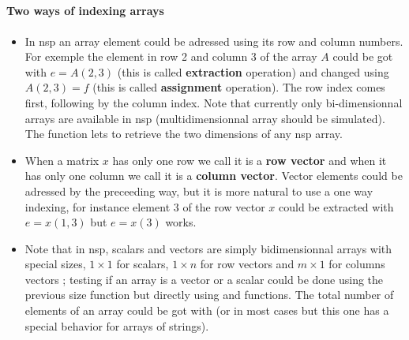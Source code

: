 
\begin{mandesc}
   \\
   \\
   \\
\end{mandesc}

\paragraph{Two ways of indexing arrays}
\begin{itemize}

\item  In nsp an array element could be adressed using its row 
 and column numbers. For exemple the element in row 2
 and column 3 of the array $A$ could be got with
 $e = A(2,3)$ (this is called {\bf extraction} operation) 
and changed using $A(2,3) = f$ (this is called {\bf assignment} operation). 
The row  index comes first, following by the column index. 
Note that currently only bi-dimensionnal arrays are available in nsp
(multidimensionnal array should be simulated).
The function  lets to retrieve the two dimensions
of any nsp array.

\item When a matrix $x$ has only one row we call it
 is a {\bf row vector} and when it has only one column we
 call it is a {\bf column vector}. Vector elements could be 
 adressed by the preceeding way, but it is more natural
 to use a one way indexing, for instance element 3 of the
 row vector $x$ could be extracted with $e = x(1,3)$ but 
 $e = x(3)$ works. 

\item Note that in nsp, scalars and vectors are simply bidimensionnal 
arrays with special sizes, $1 \times 1$ for scalars, $1 \times n$ for
row vectors and  $m \times 1$ for columns vectors ; testing if an array
is a vector or a scalar could be done using the previous size function
but directly using  and 
functions. The total number of elements of an array could be got with
 (or  in most cases but
this one has a special behavior for arrays of strings).



\end{itemize}
